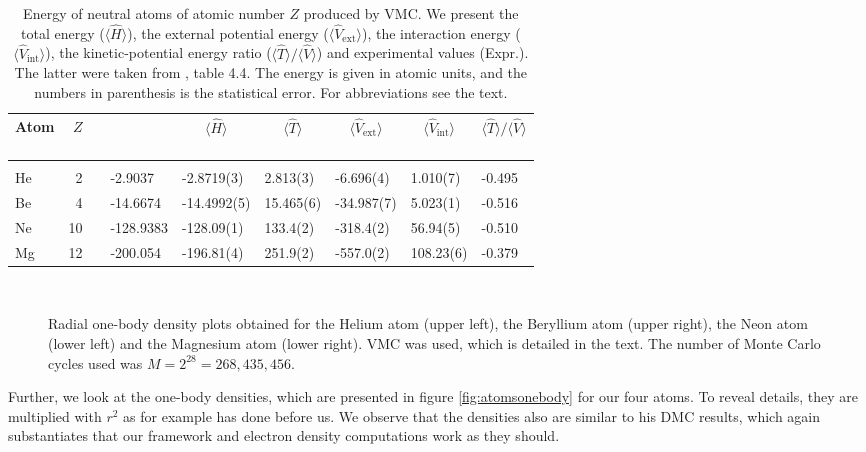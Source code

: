 \begin{table}
	\caption{Energy of neutral atoms of atomic number $Z$ produced by VMC. We present the total energy ($\langle\hat{H}\rangle$), the external potential energy ($\langle\hat{V}_{\text{ext}}\rangle$), the interaction energy ($\langle\hat{V}_{\text{int}}\rangle$), the kinetic-potential energy ratio ($\langle\hat{T}\rangle/\langle\hat{V}\rangle$) and experimental values (Expr.). The latter were taken from \citet{degroote_faddeev_2013}, table 4.4. The energy is given in atomic units, and the numbers in parenthesis is the statistical error. For abbreviations see the text.}
	\label{tab:atomswinteraction}
	\begin{tabularx}{\textwidth}{lrrR{2cm}R{1.9cm}|R{1.8cm}R{1.8cm}R{1.8cm}R{1.7cm}} \hline\hline
		Atom & $Z$ & \makecell{\\ \phantom{=} \\ \phantom{=}} & 
		 &  &  &  &  &  \\ \hline \\
		
		He & 2 && -2.9037 & -2.8719(3) & 2.813(3) & -6.696(4) & 1.010(7) & -0.495 \\
		Be & 4 && -14.6674 & -14.4992(5) & 15.465(6) & -34.987(7) & 5.023(1) & -0.516 \\
		Ne & 10 && -128.9383 & -128.09(1) & 133.4(2) & -318.4(2) & 56.94(5) & -0.510 \\ 
		Mg & 12 && -200.054 & -196.81(4) & 251.9(2) & -557.0(2) & 108.23(6) & -0.379 \\ \hline\hline
	\end{tabularx}
\end{table}
\begin{figure}
	\centering
	\captionsetup[subfigure]{labelformat=empty}
	\\
	\caption{Radial one-body density plots obtained for the Helium atom (upper left), the Beryllium atom (upper right), the Neon atom (lower left) and the Magnesium atom (lower right). VMC was used, which is detailed in the text. The number of Monte Carlo cycles used was $M=2^{28}=268,435,456$.}
	\label{fig:atomsonebody}
\end{figure}
Further, we look at the one-body densities, which are presented in figure \eqref{fig:atomsonebody} for our four atoms. To reveal details, they are multiplied with $r^2$ as for example \citet{hogberget_quantum_2013} has done before us. We observe that the densities also are similar to his DMC results, which again substantiates that our framework and electron density computations work as they should.
